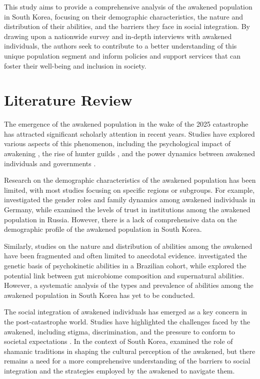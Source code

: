 \documentclass[12pt, a4paper]{article}
\begin{document}
This study aims to provide a comprehensive analysis of the awakened population in South Korea, focusing on their demographic characteristics, the nature and distribution of their abilities, and the barriers they face in social integration. By drawing upon a nationwide survey and in-depth interviews with awakened individuals, the authors seek to contribute to a better understanding of this unique population segment and inform policies and support services that can foster their well-being and inclusion in society.

\section{Literature Review}
The emergence of the awakened population in the wake of the 2025 catastrophe has attracted significant scholarly attention in recent years. Studies have explored various aspects of this phenomenon, including the psychological impact of awakening \citep{lee2027psychological}, the rise of hunter guilds \citep{kim2027emergence, seo2027shamanism}, and the power dynamics between awakened individuals and governments \citep{nakamura2027rise}.

Research on the demographic characteristics of the awakened population has been limited, with most studies focusing on specific regions or subgroups. For example, \citet{muller2026shifting} investigated the gender roles and family dynamics among awakened individuals in Germany, while \citet{smirnov2026trust} examined the levels of trust in institutions among the awakened population in Russia. However, there is a lack of comprehensive data on the demographic profile of the awakened population in South Korea.

Similarly, studies on the nature and distribution of abilities among the awakened have been fragmented and often limited to anecdotal evidence. \citet{oliveira2027genetic} investigated the genetic basis of psychokinetic abilities in a Brazilian cohort, while \citet{gao2026gut} explored the potential link between gut microbiome composition and supernatural abilities. However, a systematic analysis of the types and prevalence of abilities among the awakened population in South Korea has yet to be conducted.

The social integration of awakened individuals has emerged as a key concern in the post-catastrophe world. Studies have highlighted the challenges faced by the awakened, including stigma, discrimination, and the pressure to conform to societal expectations \citep{al-othman2026stigma, nakamura2027rise}. In the context of South Korea, \citet{seo2027shamanism} examined the role of shamanic traditions in shaping the cultural perception of the awakened, but there remains a need for a more comprehensive understanding of the barriers to social integration and the strategies employed by the awakened to navigate them.
\end{document}
